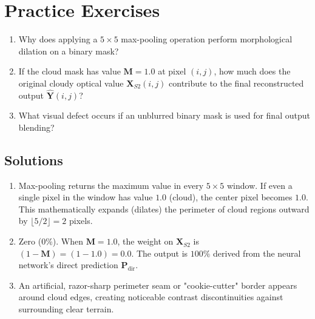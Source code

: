 \section{Practice Exercises}
\begin{enumerate}
    \item Why does applying a $5 \times 5$ max-pooling operation perform morphological dilation on a binary mask?
    \item If the cloud mask has value $\mathbf{M} = 1.0$ at pixel $(i, j)$, how much does the original cloudy optical value $\mathbf{X}_{S2}(i, j)$ contribute to the final reconstructed output $\hat{\mathbf{Y}}(i, j)$?
    \item What visual defect occurs if an unblurred binary mask is used for final output blending?
\end{enumerate}

\subsection*{Solutions}
\begin{enumerate}
    \item Max-pooling returns the maximum value in every $5 \times 5$ window. If even a single pixel in the window has value $1.0$ (cloud), the center pixel becomes $1.0$. This mathematically expands (dilates) the perimeter of cloud regions outward by $\lfloor 5/2 \rfloor = 2$ pixels.
    \item Zero ($0\%$). When $\mathbf{M} = 1.0$, the weight on $\mathbf{X}_{S2}$ is $(1 - \mathbf{M}) = (1 - 1.0) = 0.0$. The output is $100\%$ derived from the neural network's direct prediction $\mathbf{P}_{\text{dir}}$.
    \item An artificial, razor-sharp perimeter seam or "cookie-cutter" border appears around cloud edges, creating noticeable contrast discontinuities against surrounding clear terrain.
\end{enumerate}
